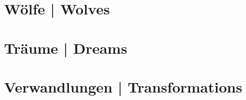 
\part{Wölfe | Wolves}
















\part{Träume | Dreams}

















\part{Verwandlungen | Transformations}














